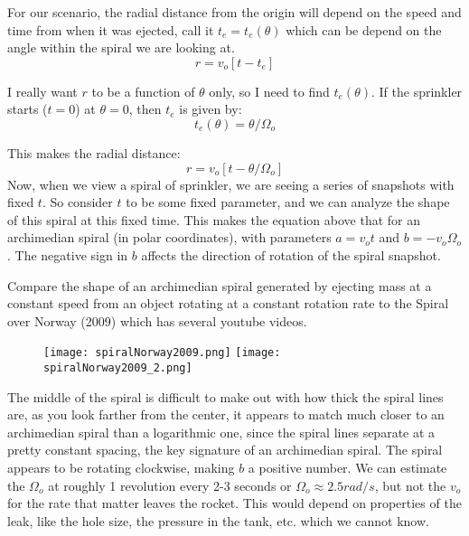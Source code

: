 \documentclass[10pt]{article}
\begin{document}
For our scenario, the radial distance from the origin will depend on 
the speed and time from when it was ejected, call it $t_e = t_e(\theta)$ 
which can be depend on the angle within the spiral we are looking at.
\begin{equation}
    r = v_o[t - t_e]
\end{equation}

I really want $r$ to be a function of $\theta$ only, so I need to find 
$t_e(\theta)$. If the sprinkler starts ($t=0$) at $\theta=0$, then 
$t_e$ is given by:
\begin{equation}
    t_e(\theta) = \theta/\Omega_o
\end{equation} 

This makes the radial distance:
\begin{equation}
    r = v_o[t - \theta/\Omega_o]
\end{equation}
Now, when we view a spiral of sprinkler, we are seeing a series of snapshots
with fixed $t$. So consider $t$ to be some fixed parameter, and we can 
analyze the shape of this spiral at this fixed time. This makes 
the equation above that for an archimedian spiral (in polar coordinates), 
with parameters $a = v_ot$ and $b = -v_o\Omega_o$. The negative sign in $b$
affects the direction of rotation of the spiral snapshot.

Compare the shape of an archimedian spiral generated by ejecting mass at a 
constant speed from an object rotating at a constant rotation rate to 
the Spiral over Norway (2009) which has several youtube videos. 


\begin{figure}[H]
\begin{center}
    \texttt{[image: spiralNorway2009.png]}
    \texttt{[image: spiralNorway2009\_2.png]}
\end{center}
\end{figure}


The 
middle of the spiral is difficult to make out with how thick the spiral 
lines are, as you look farther from the center, it appears to match 
much closer to an archimedian spiral than a logarithmic one, since 
the spiral lines separate at a pretty constant spacing, the key signature 
of an archimedian spiral. The spiral appears to be rotating clockwise, 
making $b$ a positive number. We can estimate the $\Omega_o$ at roughly
1 revolution every 2-3 seconds or $\Omega_o\approx2.5 rad/s$, but not 
the $v_o$ for the rate that matter leaves the rocket. This would depend 
on properties of the leak, like the hole size, the pressure 
in the tank, etc. which we cannot know.
\end{document}
